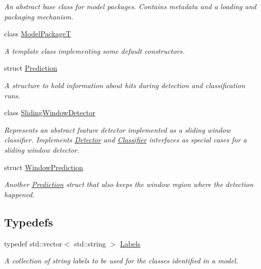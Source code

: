 \begin{DoxyCompactItemize}
\begin{DoxyCompactList}\small\item\em An abstract base class for model packages. Contains metadata and a loading and packaging mechanism. \end{DoxyCompactList}\item 
class \hyperlink{classdg_1_1deepcore_1_1classification_1_1_model_package_t}{Model\+PackageT}
\begin{DoxyCompactList}\small\item\em A template class implementing some default constructors. \end{DoxyCompactList}\item 
struct \hyperlink{structdg_1_1deepcore_1_1classification_1_1_prediction}{Prediction}
\begin{DoxyCompactList}\small\item\em A structure to hold information about hits during detection and classification runs. \end{DoxyCompactList}\item 
class \hyperlink{classdg_1_1deepcore_1_1classification_1_1_sliding_window_detector}{Sliding\+Window\+Detector}
\begin{DoxyCompactList}\small\item\em Represents an abstract feature detector implemented as a sliding window classifier. Implements \hyperlink{classdg_1_1deepcore_1_1classification_1_1_detector}{Detector} and \hyperlink{classdg_1_1deepcore_1_1classification_1_1_classifier}{Classifier} interfaces as special cases for a sliding window detector. \end{DoxyCompactList}\item 
struct \hyperlink{structdg_1_1deepcore_1_1classification_1_1_window_prediction}{Window\+Prediction}
\begin{DoxyCompactList}\small\item\em Another \hyperlink{structdg_1_1deepcore_1_1classification_1_1_prediction}{Prediction} struct that also keeps the window region where the detection happened. \end{DoxyCompactList}\end{DoxyCompactItemize}
\subsection*{Typedefs}
\begin{DoxyCompactItemize}
\item 
typedef std\+::vector$<$ std\+::string $>$ \hyperlink{group___classification_module_ga4c4d47162fed299b627f2e9d17381866}{Labels}
\begin{DoxyCompactList}\small\item\em A collection of string labels to be used for the classes identified in a model. \end{DoxyCompactList}\end{DoxyCompactItemize}
